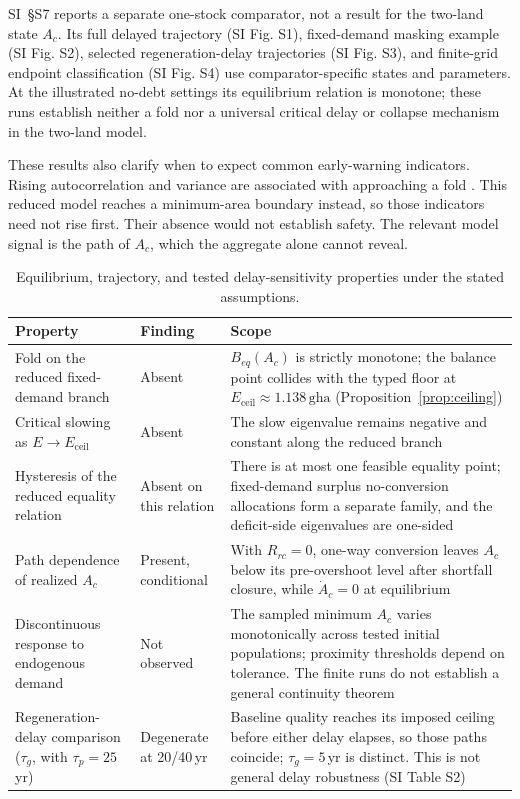 \documentclass[preprint,12pt,authoryear]{elsarticle}
\newcommand{\Eceil}{E_{\mathrm{ceil}}}
\begin{document}
SI~\S S7 reports a separate one-stock comparator, not a result for the two-land state $A_c$. Its full delayed trajectory (SI Fig. S1), fixed-demand masking example (SI Fig. S2), selected regeneration-delay trajectories (SI Fig. S3), and finite-grid endpoint classification (SI Fig. S4) use comparator-specific states and parameters. At the illustrated no-debt settings its equilibrium relation is monotone; these runs establish neither a fold nor a universal critical delay or collapse mechanism in the two-land model.

These results also clarify when to expect common early-warning indicators. Rising autocorrelation and variance are associated with approaching a fold \citep{Scheffer2001}. This reduced model reaches a minimum-area boundary instead, so those indicators need not rise first. Their absence would not establish safety. The relevant model signal is the path of $A_c$, which the aggregate alone cannot reveal.

\begin{table}[!htbp]
\centering\footnotesize
\caption{Equilibrium, trajectory, and tested delay-sensitivity properties under the stated assumptions.}
\label{tab:neg}
\begin{tabularx}{\textwidth}{>{\raggedright\arraybackslash}p{} l >{\raggedright\arraybackslash}X}
\toprule
Property & Finding & Scope \\
\midrule
Fold on the reduced fixed-demand branch & Absent & $B_{eq}(A_c)$ is strictly monotone; the balance point collides with the typed floor at $\Eceil\approx1.138\,\mathrm{gha}$ (Proposition~\ref{prop:ceiling}) \\
Critical slowing as $E\to\Eceil$ & Absent & The slow eigenvalue remains negative and constant along the reduced branch \\
Hysteresis of the reduced equality relation & Absent on this relation & There is at most one feasible equality point; fixed-demand surplus no-conversion allocations form a separate family, and the deficit-side eigenvalues are one-sided \\
Path dependence of realized $A_c$ & Present, conditional & With $R_{rc}=0$, one-way conversion leaves $A_c$ below its pre-overshoot level after shortfall closure, while $\dot A_c=0$ at equilibrium \\
Discontinuous response to endogenous demand & Not observed & The sampled minimum $A_c$ varies monotonically across tested initial populations; proximity thresholds depend on tolerance. The finite runs do not establish a general continuity theorem \\
Regeneration-delay comparison ($\tau_g$, with $\tau_p=25$\,yr) & Degenerate at 20/40\,yr & Baseline quality reaches its imposed ceiling before either delay elapses, so those paths coincide; $\tau_g=5$\,yr is distinct. This is not general delay robustness (SI Table S2) \\
\bottomrule
\end{tabularx}
\end{table}
\clearpage
\end{document}

